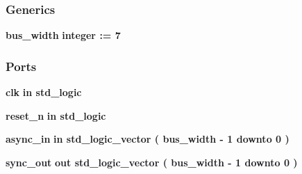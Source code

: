 \subsubsection*{Generics}
 \begin{DoxyCompactItemize}
\item 
{\bf bus\+\_\+width} {\bfseries {\bfseries \textcolor{comment}{integer}\textcolor{vhdlchar}{ }\textcolor{vhdlchar}{ }\textcolor{vhdlchar}{\+:}\textcolor{vhdlchar}{=}\textcolor{vhdlchar}{ }\textcolor{vhdlchar}{ } \textcolor{vhdldigit}{7} \textcolor{vhdlchar}{ }}}
\end{DoxyCompactItemize}
\subsubsection*{Ports}
 \begin{DoxyCompactItemize}
\item 
{\bf clk}  {\bfseries {\bfseries \textcolor{keywordflow}{in}\textcolor{vhdlchar}{ }}} {\bfseries \textcolor{comment}{std\+\_\+logic}\textcolor{vhdlchar}{ }} 
\item 
{\bf reset\+\_\+n}  {\bfseries {\bfseries \textcolor{keywordflow}{in}\textcolor{vhdlchar}{ }}} {\bfseries \textcolor{comment}{std\+\_\+logic}\textcolor{vhdlchar}{ }} 
\item 
{\bf async\+\_\+in}  {\bfseries {\bfseries \textcolor{keywordflow}{in}\textcolor{vhdlchar}{ }}} {\bfseries \textcolor{comment}{std\+\_\+logic\+\_\+vector}\textcolor{vhdlchar}{ }\textcolor{vhdlchar}{(}\textcolor{vhdlchar}{ }\textcolor{vhdlchar}{ }\textcolor{vhdlchar}{ }\textcolor{vhdlchar}{ }{\bfseries {\bf bus\+\_\+width}} \textcolor{vhdlchar}{-\/}\textcolor{vhdlchar}{ } \textcolor{vhdldigit}{1} \textcolor{vhdlchar}{ }\textcolor{keywordflow}{downto}\textcolor{vhdlchar}{ }\textcolor{vhdlchar}{ } \textcolor{vhdldigit}{0} \textcolor{vhdlchar}{ }\textcolor{vhdlchar}{)}\textcolor{vhdlchar}{ }} 
\item 
{\bf sync\+\_\+out}  {\bfseries {\bfseries \textcolor{keywordflow}{out}\textcolor{vhdlchar}{ }}} {\bfseries \textcolor{comment}{std\+\_\+logic\+\_\+vector}\textcolor{vhdlchar}{ }\textcolor{vhdlchar}{(}\textcolor{vhdlchar}{ }\textcolor{vhdlchar}{ }\textcolor{vhdlchar}{ }\textcolor{vhdlchar}{ }{\bfseries {\bf bus\+\_\+width}} \textcolor{vhdlchar}{-\/}\textcolor{vhdlchar}{ } \textcolor{vhdldigit}{1} \textcolor{vhdlchar}{ }\textcolor{keywordflow}{downto}\textcolor{vhdlchar}{ }\textcolor{vhdlchar}{ } \textcolor{vhdldigit}{0} \textcolor{vhdlchar}{ }\textcolor{vhdlchar}{)}\textcolor{vhdlchar}{ }} 
\end{DoxyCompactItemize}


